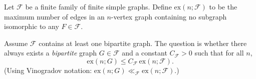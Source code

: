 Let $\mathcal{F}$ be a finite family of finite simple graphs.
Define $\mathrm{ex}(n;\mathcal{F})$ to be the maximum number of edges in an $n$-vertex graph containing no subgraph isomorphic to any $F\in\mathcal{F}$.

Assume $\mathcal{F}$ contains at least one bipartite graph.
The question is whether there always exists a \emph{bipartite} graph $G\in\mathcal{F}$ and a constant $C_{\mathcal{F}}>0$ such that for all $n$,
\[
\mathrm{ex}(n;G) \le C_{\mathcal{F}}\, \mathrm{ex}(n;\mathcal{F}).
\]
(Using Vinogradov notation: $\mathrm{ex}(n;G)\ll_{\mathcal{F}} \mathrm{ex}(n;\mathcal{F})$.)
